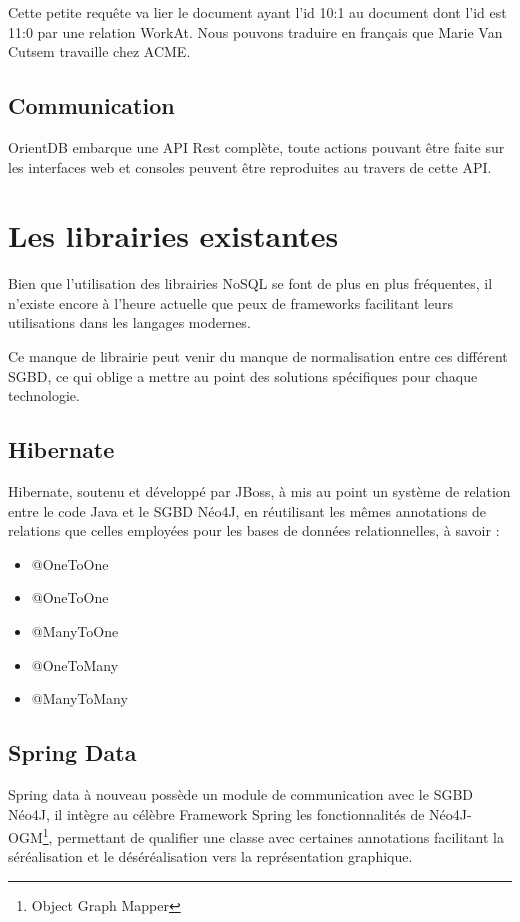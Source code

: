 \documentclass[a4paper,fleqn,12pt]{report}
\begin{document}
Cette petite requête va lier le document ayant l'id 10:1 au document dont l'id est 11:0 par une relation WorkAt. Nous pouvons traduire en français que Marie Van Cutsem travaille chez ACME.


\section{Communication}

OrientDB embarque une API Rest complète, toute actions pouvant être faite sur les interfaces web et consoles peuvent être reproduites au travers de cette API. 



\chapter{Les librairies existantes}

Bien que l'utilisation des librairies NoSQL se font de plus en plus fréquentes, il n'existe encore à l'heure actuelle que peux de frameworks facilitant leurs utilisations dans les langages modernes. 

Ce manque de librairie peut venir du manque de normalisation entre ces différent SGBD, ce qui oblige a mettre au point des solutions spécifiques pour chaque technologie. 

\section*{Hibernate}

Hibernate, soutenu et développé par JBoss, à mis au point un système de relation entre le code Java et le SGBD Néo4J, en réutilisant les mêmes annotations de relations que celles employées pour les bases de données relationnelles, à savoir  :

\begin{itemize}
\item @OneToOne
\item @OneToOne
\item @ManyToOne
\item @OneToMany
\item @ManyToMany
\end{itemize}


\section*{Spring Data}

Spring data à nouveau possède un module de communication avec le SGBD Néo4J, il intègre au célèbre Framework Spring les fonctionnalités de Néo4J-OGM\footnote{Object Graph Mapper}, permettant de qualifier une classe avec certaines annotations facilitant la séréalisation et le déséréalisation vers la représentation graphique.
\end{document}
